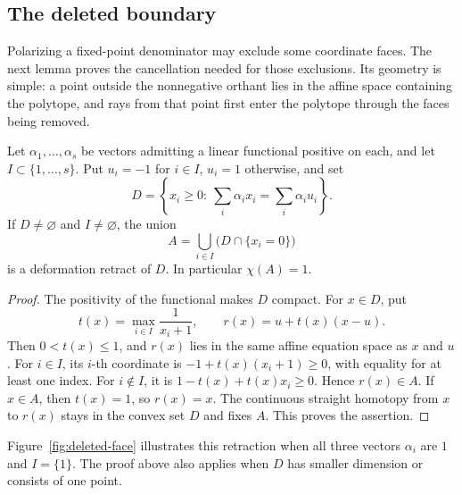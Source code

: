 \subsection{The deleted boundary}

Polarizing a fixed-point denominator may exclude some coordinate faces.
The next lemma proves the cancellation needed for those exclusions.
Its geometry is simple: a point outside the nonnegative orthant lies
in the affine space containing the polytope, and rays from that point
first enter the polytope through the faces being removed.

\begin{lemma}\label{lem:faces}
Let \(\alpha_1,\ldots,\alpha_s\) be vectors admitting a linear
functional positive on each, and let \(I\subset\{1,\ldots,s\}\).
Put \(u_i=-1\) for \(i\in I\), \(u_i=1\) otherwise, and set
\[
D=\left\{x_i\ge0:\ \sum_i\alpha_ix_i=\sum_i\alpha_iu_i\right\}.
\]
If \(D\ne\varnothing\) and \(I\ne\varnothing\), the union
\[
A=\bigcup_{i\in I}\bigl(D\cap\{x_i=0\}\bigr)
\]
is a deformation retract of \(D\). In particular \(\chi(A)=1\).
\end{lemma}

\begin{proof}
The positivity of the functional makes \(D\) compact.
For \(x\in D\), put
\[
t(x)=\max_{i\in I}\frac1{x_i+1},\qquad
r(x)=u+t(x)(x-u).
\]
Then \(0<t(x)\le1\), and \(r(x)\) lies in the same affine equation
space as \(x\) and \(u\).
For \(i\in I\), its \(i\)-th coordinate is
\(-1+t(x)(x_i+1)\ge0\), with equality for at least one index.
For \(i\notin I\), it is \(1-t(x)+t(x)x_i\ge0\).
Hence \(r(x)\in A\).
If \(x\in A\), then \(t(x)=1\), so \(r(x)=x\).
The continuous straight homotopy from \(x\) to \(r(x)\) stays in the
convex set \(D\) and fixes \(A\). This proves the assertion.
\end{proof}

Figure~\ref{fig:deleted-face} illustrates this retraction when all three
vectors \(\alpha_i\) are \(1\) and \(I=\{1\}\). The proof above
also applies when \(D\) has smaller dimension or consists of one point.

